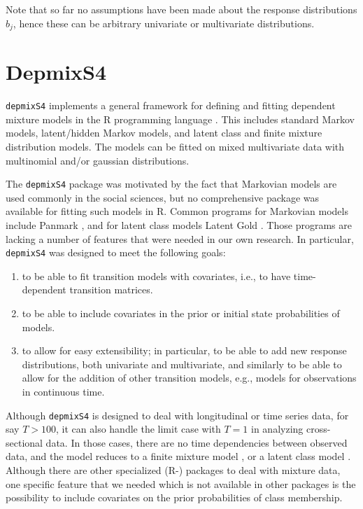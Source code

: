 \documentclass[a4paper,12pt,man,english]{apa} %
\newcommand{\citep}{\cite}
\newcommand{\pkg}{\texttt}
\begin{document}
Note that so far no assumptions have been made about the response
distributions $b_{j}$, hence these can be arbitrary univariate or
multivariate distributions.


\section{DepmixS4}

\pkg{depmixS4} implements a general framework for defining and fitting
dependent mixture models in the R programming language \citep{R2008}.
This includes standard Markov models, latent/hidden Markov models, and
latent class and finite mixture distribution models.  The models can
be fitted on mixed multivariate data with multinomial and/or gaussian
distributions.  

The \pkg{depmixS4} package was motivated by the fact that Markovian
models are used commonly in the social sciences, but no comprehensive
package was available for fitting such models in R. Common programs
for Markovian models include Panmark \citep{Pol1996}, and for latent
class models Latent Gold \citep{Vermunt2003}.  Those programs are
lacking a number of features that were needed in our own research.  In
particular, \pkg{depmixS4} was designed to meet the following goals:
\begin{enumerate}

	\item to be able to fit transition models with covariates, i.e.,
	to have time-dependent transition matrices.

	\item to be able to include covariates in the prior or initial
	state probabilities of models.

	\item to allow for easy extensibility; in particular, to be able
	to add new response distributions, both univariate and
	multivariate, and similarly to be able to allow for the addition
	of other transition models, e.g., models for observations in 
	continuous time. 

\end{enumerate}

Although \pkg{depmixS4} is designed to deal with longitudinal or time
series data, for say $T>100$, it can also handle the limit case with
$T=1$ in analyzing cross-sectional data.  In those cases, there are no
time dependencies between observed data, and the model reduces to a
finite mixture model \cite{McLachlan2000}, or a latent class model
\cite{McCutcheon1987}.  Although there are other specialized (R-)
packages to deal with mixture data, one specific feature that we
needed which is not available in other packages is the possibility to
include covariates on the prior probabilities of class membership.
\end{document}
